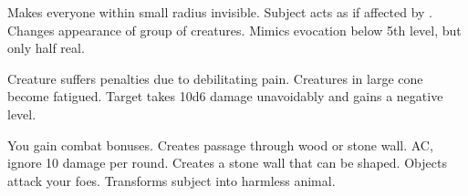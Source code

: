 \begin{swspelllist}
 Makes everyone within small radius invisible.
 Subject acts as if affected by .
 Changes appearance of group of creatures.
 Mimics evocation below 5th level, but only half real.

 Creature suffers penalties due to debilitating pain.
 Creatures in large cone become fatigued.
 Target takes 10d6 damage unavoidably and gains a negative level.
\spellheadrestricted{}

\M You gain combat bonuses.
 Creates passage through wood or stone wall.
  AC, ignore 10 damage per round.
 Creates a stone wall that can be shaped.
 Objects attack your foes.
 Transforms subject into harmless animal.
\end{swspelllist}

